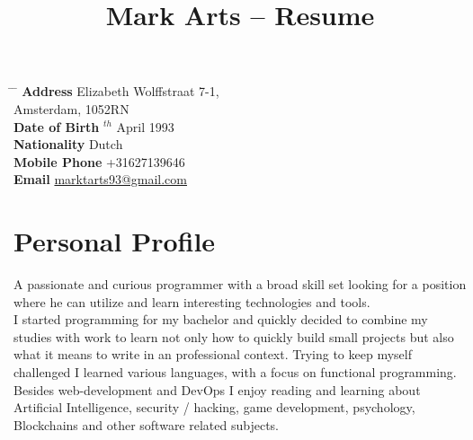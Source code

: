 \documentclass[10pt]{article} %
\begin{document}

\title{Mark Arts -- Resume} %


\parbox{0.5\textwidth}{ %
\begin{tabbing} %
\hspace{3cm} \= \hspace{4cm} \= \kill %
{\bf Address} \> Elizabeth Wolffstraat 7-1,\\ %
\> Amsterdam, 1052RN \\ %
{\bf Date of Birth} $^{th}$ April 1993 \\ %
{\bf Nationality} \> Dutch \\%
{\bf Mobile Phone} \> +31627139646 \\ %
{\bf Email} \> \href{mailto:marktarts93@gmail.com}{marktarts93@gmail.com} \\ %
\end{tabbing}}


\section{Personal Profile}

A passionate and curious programmer with a broad skill set looking for a position where he can utilize and learn interesting technologies and tools. \\

I started programming for my bachelor and quickly decided to combine my studies with work to learn not only how to quickly build small projects but also what it means to write in an professional context. Trying to keep myself challenged I learned various languages, with a focus on functional programming. \\

Besides web-development and DevOps I enjoy reading and learning about Artificial Intelligence, security / hacking, game development, psychology, Blockchains and other software related subjects. \\
\end{document}
